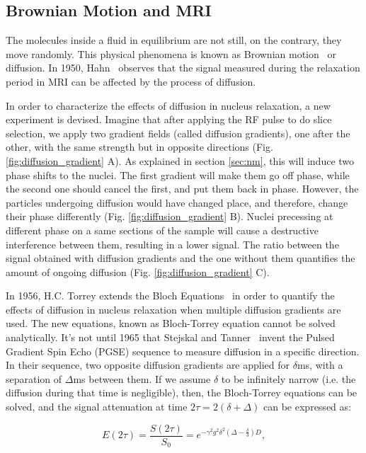 \subsection{Brownian Motion and MRI}
The molecules inside a fluid in equilibrium are not still, on the contrary, 
they move randomly. This physical phenomena is known as Brownian motion~\cite{Brown1828}
or diffusion. In 1950, Hahn~\cite{Hahn1950} observes that the signal measured
during the relaxation period in MRI can be affected by the process of diffusion.

In order to characterize the effects of diffusion in nucleus relaxation, a
new experiment is devised. Imagine that after applying the RF pulse to do
slice selection, we apply two gradient fields (called diffusion gradients), one
after the other, with the same strength but in opposite directions (Fig. \ref{fig:diffusion_gradient} A).
As explained in section \ref{sec:nm}, this will induce two phase shifts to the nuclei.
The first gradient will make them go off phase, while the second one should
cancel the first, and put them back in phase. However, the particles undergoing
diffusion would have changed place, and therefore, change their phase differently
(Fig. \ref{fig:diffusion_gradient} B). Nuclei precessing at different phase on
a same sections of the sample will cause a destructive interference between them,
resulting in a lower signal. The ratio between the signal obtained with 
diffusion gradients and the one without them quantifies the amount of ongoing
diffusion (Fig. \ref{fig:diffusion_gradient} C).

In 1956, H.C. Torrey \cite{Torrey1956} extends the Bloch Equations~\cite{Bloch1946}
in order to quantify the effects of diffusion in nucleus relaxation when
multiple diffusion gradients are used. The new equations, known as Bloch-Torrey
equation cannot be solved analytically. It's not until 1965 that
Stejskal and Tanner~\cite{Stejskal1965} invent the Pulsed Gradient Spin
Echo (PGSE) sequence to measure diffusion in a specific direction. In their
sequence, two opposite diffusion gradients are applied for $\delta$ms, with a
separation of $\Delta$ms between them. If we assume $\delta$ to be infinitely
narrow (i.e. the diffusion during that time is negligible), then,
the Bloch-Torrey equations can be solved, and the signal attenuation at time
$2\tau = 2(\delta + \Delta)$  can be expressed as:

\begin{equation}
    E(2\tau) = 
    \frac{S(2\tau)}{S_0} =
    e^{-\gamma^2 g^2 \delta^2 \left(\Delta - \frac{\delta}{3}\right) D},
\label{eq:stejskal_tanner}
\end{equation}

